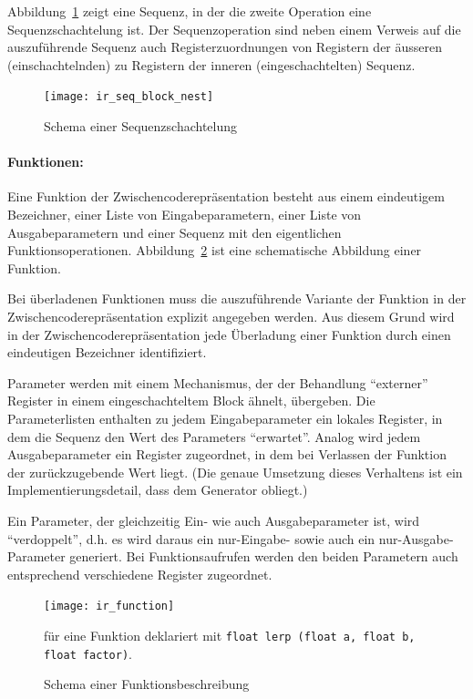 \documentclass[twoside,a4paper,fleqn,12pt]{article}
\begin{document}
Abbildung~\ref{fig:ir_seq_block_nest} zeigt eine Sequenz, in der die zweite Operation eine Sequenzschachtelung ist.
Der Sequenzoperation sind neben einem Verweis auf die auszuführende Sequenz auch Registerzuordnungen von
Registern der äusseren (einschachtelnden) zu Registern der inneren (eingeschachtelten) Sequenz.

\begin{figure}[h]
   \centering
  \texttt{[image: ir\_seq\_block\_nest]}
  \caption{Schema einer Sequenzschachtelung}
  \label{fig:ir_seq_block_nest}
\end{figure}

\paragraph{Funktionen:}
Eine Funktion der Zwischencoderepräsentation besteht aus einem eindeutigem Bezeichner, einer Liste von Eingabeparametern,
einer Liste von Ausgabeparametern und einer Sequenz mit den eigentlichen Funktionsoperationen. Abbildung~\ref{fig:ir_function}
ist eine schematische Abbildung einer Funktion.

Bei überladenen Funktionen muss die auszuführende Variante der Funktion in der Zwischencoderepräsentation
explizit angegeben werden.
Aus diesem Grund wird in der Zwischencoderepräsentation jede Überladung einer Funktion durch einen eindeutigen Bezeichner identifiziert.

Parameter werden mit einem Mechanismus, der der Behandlung "`externer"' Register in einem eingeschachteltem
Block ähnelt, übergeben. Die Parameterlisten enthalten zu jedem Eingabeparameter ein lokales Register, in dem die
Sequenz den Wert des Parameters "`erwartet"'. Analog wird jedem Ausgabeparameter ein Register zugeordnet,
in dem bei Verlassen der Funktion der zurückzugebende Wert liegt.
(Die genaue Umsetzung dieses Verhaltens ist ein Implementierungsdetail, dass dem Generator obliegt.)

Ein Parameter, der gleichzeitig Ein- wie auch Ausgabeparameter ist, wird "`verdoppelt"', d.h. es wird daraus
ein nur-Eingabe- sowie auch ein nur-Ausgabe-Parameter generiert. Bei Funktionsaufrufen werden den beiden
Parametern auch entsprechend verschiedene Register zugeordnet.

\begin{figure}[h]
   \centering
  \texttt{[image: ir\_function]}
  \caption{Schema einer Funktionsbeschreibung}
  {\small für eine Funktion deklariert mit \texttt{float lerp (float a, float b, float factor)}.}
  \label{fig:ir_function}
\end{figure}
\end{document}
